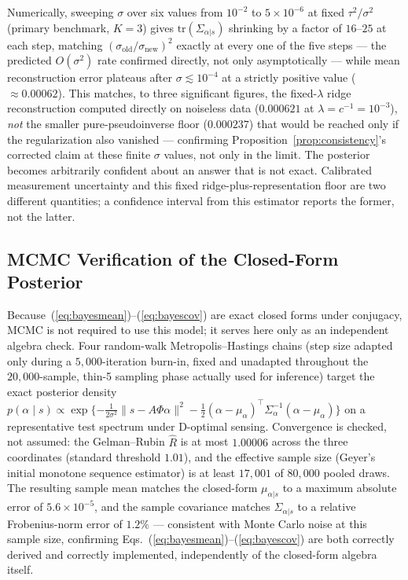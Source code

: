 \documentclass[11pt]{article}
\begin{document}
Numerically, sweeping $\sigma$ over six values from $10^{-2}$ to $5\times10^{-6}$ at fixed $\tau^2/\sigma^2$ (primary benchmark, $K=3$) gives $\mathrm{tr}(\Sigma_{\alpha|s})$ shrinking by a factor of $16$--$25$ at each step, matching $(\sigma_{\text{old}}/\sigma_{\text{new}})^2$ exactly at every one of the five steps --- the predicted $O(\sigma^2)$ rate confirmed directly, not only asymptotically --- while mean reconstruction error plateaus after $\sigma\lesssim10^{-4}$ at a strictly positive value ($\approx0.00062$). This matches, to three significant figures, the fixed-$\lambda$ ridge reconstruction computed directly on noiseless data ($0.000621$ at $\lambda=c^{-1}=10^{-3}$), \emph{not} the smaller pure-pseudoinverse floor ($0.000237$) that would be reached only if the regularization also vanished --- confirming Proposition~\ref{prop:consistency}'s corrected claim at these finite $\sigma$ values, not only in the limit. The posterior becomes arbitrarily confident about an answer that is not exact. Calibrated measurement uncertainty and this fixed ridge-plus-representation floor are two different quantities; a confidence interval from this estimator reports the former, not the latter.

\subsection{MCMC Verification of the Closed-Form Posterior}
\label{sec:mcmcverify}

Because~(\ref{eq:bayesmean})--(\ref{eq:bayescov}) are exact closed forms under conjugacy, MCMC is not required to use this model; it serves here only as an independent algebra check. Four random-walk Metropolis--Hastings chains (step size adapted only during a $5{,}000$-iteration burn-in, fixed and unadapted throughout the $20{,}000$-sample, thin-5 sampling phase actually used for inference) target the exact posterior density $p(\alpha\mid s)\propto\exp\{-\tfrac{1}{2\sigma^2}\|s-A\Phi\alpha\|^2-\tfrac12(\alpha-\mu_\alpha)^\top\Sigma_\alpha^{-1}(\alpha-\mu_\alpha)\}$ on a representative test spectrum under D-optimal sensing. Convergence is checked, not assumed: the Gelman--Rubin $\hat{R}$ is at most $1.00006$ across the three coordinates (standard threshold $1.01$), and the effective sample size (Geyer's initial monotone sequence estimator) is at least $17{,}001$ of $80{,}000$ pooled draws. The resulting sample mean matches the closed-form $\mu_{\alpha|s}$ to a maximum absolute error of $5.6\times10^{-5}$, and the sample covariance matches $\Sigma_{\alpha|s}$ to a relative Frobenius-norm error of $1.2\%$ --- consistent with Monte Carlo noise at this sample size, confirming Eqs.~(\ref{eq:bayesmean})--(\ref{eq:bayescov}) are both correctly derived and correctly implemented, independently of the closed-form algebra itself.
\end{document}

